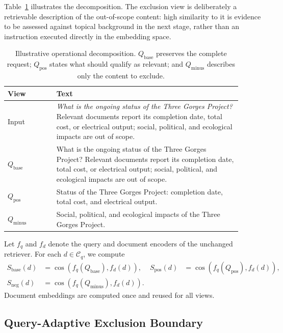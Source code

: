 \documentclass[letterpaper]{article}
\newcommand{\qbase}{Q_{\text{base}}}
\newcommand{\qpos}{Q_{\text{pos}}}
\newcommand{\qminus}{Q_{\text{minus}}}
\newcommand{\sbase}{S_{\text{base}}}
\newcommand{\spos}{S_{\text{pos}}}
\newcommand{\sneg}{S_{\text{neg}}}
\begin{document}
Table~\ref{tab:decomposition-example} illustrates the decomposition.
The exclusion view is deliberately a retrievable description of the
out-of-scope content: high similarity to it is evidence to be assessed
against topical background in the next stage, rather than an instruction
executed directly in the embedding space.

\begin{table}[t]
\centering
\caption{Illustrative operational decomposition.  $\qbase$ preserves
the complete request; $\qpos$ states what should qualify as relevant;
and $\qminus$ describes only the content to exclude.}
\label{tab:decomposition-example}
\small
\setlength{\tabcolsep}{3pt}
\renewcommand{\arraystretch}{1.12}
\begin{tabular}{p{0.19\linewidth} p{0.72\linewidth}}
\toprule
\textbf{View} & \textbf{Text} \\
\midrule
Input & \emph{What is the ongoing status of the Three Gorges Project?}
Relevant documents report its completion date, total cost, or electrical
output; social, political, and ecological impacts are out of scope. \\
$\qbase$ & What is the ongoing status of the Three Gorges Project?
Relevant documents report its completion date, total cost, or electrical
output; social, political, and ecological impacts are out of scope. \\
$\qpos$ & Status of the Three Gorges Project: completion date, total
cost, and electrical output. \\
$\qminus$ & Social, political, and ecological impacts of the Three
Gorges Project. \\
\bottomrule
\end{tabular}
\end{table}

Let $f_q$ and $f_d$ denote the query and document encoders of the
unchanged retriever.  For each $d\in\mathcal{C}_q$, we compute
\begin{equation}
\begin{aligned}
 \sbase(d)&=\cos(f_q(\qbase),f_d(d)), &
 \spos(d)&=\cos(f_q(\qpos),f_d(d)),\\
 \sneg(d)&=\cos(f_q(\qminus),f_d(d)).
\end{aligned}
\label{eq:channel-scores}
\end{equation}
Document embeddings are computed once and reused for all views.

\subsection{Query-Adaptive Exclusion Boundary}
\label{sec:scoring-formula}
\end{document}
